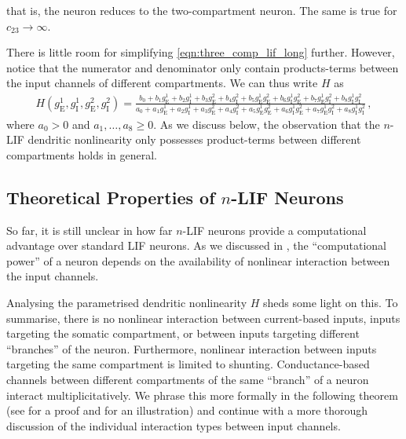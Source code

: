 that is, the neuron reduces to the two-compartment neuron. The same is true for $c_\mathrm{23} \to \infty$.

There is little room for simplifying \cref{eqn:three_comp_lif_long} further.
However, notice that the numerator and denominator only contain products-terms between the input channels of different compartments.
We can thus write $H$ as
\begin{align}
	H(g_\mathrm{E}^1, g_\mathrm{I}^1, g_\mathrm{E}^2, g_\mathrm{I}^2) =
		\frac{
	        b_0 + b_1 g^1_\mathrm{E} + b_2 g^1_\mathrm{I} +
	              b_3 g^2_\mathrm{E} + b_4 g^2_\mathrm{I} +
	              b_5 g^1_\mathrm{E} g^2_\mathrm{E} +
	              b_6 g^1_\mathrm{I} g^2_\mathrm{E} +
	              b_7 g^1_\mathrm{E} g^2_\mathrm{I} +
	              b_8 g^1_\mathrm{I} g^2_\mathrm{I}
        }{
	        a_0 + a_1 g^1_\mathrm{E} + a_2 g^1_\mathrm{I} +
	              a_3 g^2_\mathrm{E} + a_4 g^2_\mathrm{I} +
	              a_5 g^1_\mathrm{E} g^2_\mathrm{E} +
	              a_6 g^1_\mathrm{I} g^2_\mathrm{E} +
	              a_7 g^1_\mathrm{E} g^2_\mathrm{I} +
	              a_8 g^1_\mathrm{I} g^2_\mathrm{I}
        } \,,
    \label{eqn:three_comp_lif}
\end{align}
where $a_0 > 0$ and $a_1, \ldots, a_8 \geq 0$.
As we discuss below, the observation that the $n$-LIF dendritic nonlinearity only possesses product-terms between different compartments holds in general.

\subsection{Theoretical Properties of $n$-LIF Neurons}
\label{sec:nlif_theory}

So far, it is still unclear in how far $n$-LIF neurons provide a computational advantage over standard LIF neurons.
As we discussed in , the \enquote{computational power} of a neuron depends on the availability of nonlinear interaction between the input channels.

Analysing the parametrised dendritic nonlinearity $H$ sheds some light on this.
To summarise, there is no nonlinear interaction between current-based inputs, inputs targeting the somatic compartment, or between inputs targeting different \enquote{branches} of the neuron.
Furthermore, nonlinear interaction between inputs targeting the same compartment is limited to shunting.
Conductance-based channels between different compartments of the same \enquote{branch} of a neuron interact multiplicitatively.
We phrase this more formally in the following theorem (see  for a proof and  for an illustration) and continue with a more thorough discussion of the individual interaction types between input channels.


